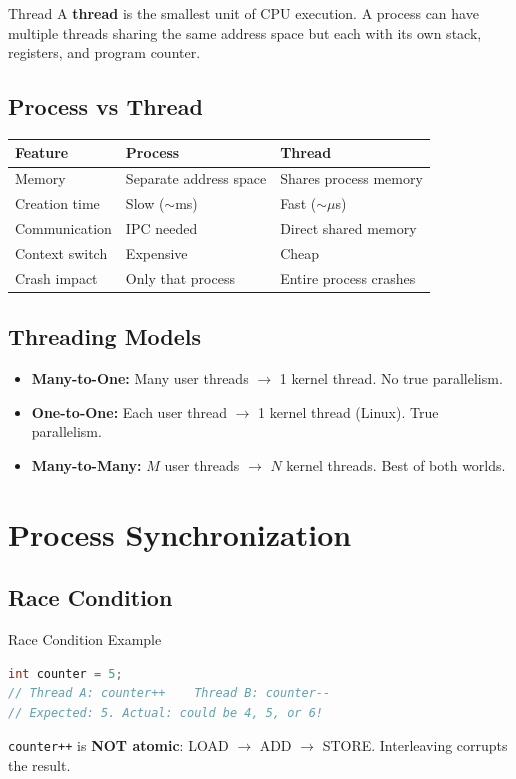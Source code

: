 \documentclass[12pt,a4paper]{article}
\begin{document}
\begin{conceptbox}{Thread}
A \textbf{thread} is the smallest unit of CPU execution. A process can have multiple threads sharing the same address space but each with its own stack, registers, and program counter.
\end{conceptbox}

\subsection{Process vs Thread}
\begin{center}
\begin{tabular}{@{} l l l @{}}
\toprule
\textbf{Feature} & \textbf{Process} & \textbf{Thread} \\
\midrule
Memory & Separate address space & Shares process memory \\
Creation time & Slow ($\sim$ms) & Fast ($\sim\mu$s) \\
Communication & IPC needed & Direct shared memory \\
Context switch & Expensive & Cheap \\
Crash impact & Only that process & Entire process crashes \\
\bottomrule
\end{tabular}
\end{center}

\subsection{Threading Models}
\begin{itemize}[leftmargin=*]
    \item \textbf{Many-to-One:} Many user threads $\rightarrow$ 1 kernel thread. No true parallelism.
    \item \textbf{One-to-One:} Each user thread $\rightarrow$ 1 kernel thread (Linux). True parallelism.
    \item \textbf{Many-to-Many:} $M$ user threads $\rightarrow$ $N$ kernel threads. Best of both worlds.
\end{itemize}

\section{Process Synchronization}

\subsection{Race Condition}
\begin{warningbox}{Race Condition Example}
\begin{lstlisting}[language=C]
int counter = 5;
// Thread A: counter++    Thread B: counter--
// Expected: 5. Actual: could be 4, 5, or 6!
\end{lstlisting}
\texttt{counter++} is \textbf{NOT atomic}: LOAD $\rightarrow$ ADD $\rightarrow$ STORE. Interleaving corrupts the result.
\end{warningbox}
\end{document}
